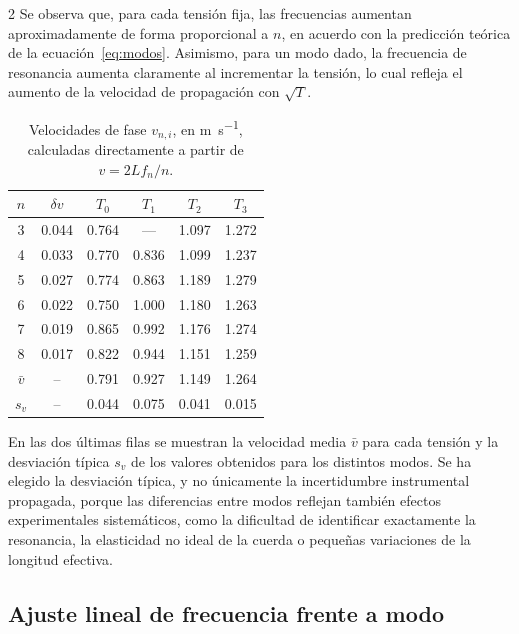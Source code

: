 \documentclass[12pt,a4paper]{article}
\begin{document}
\begin{multicols}{2}
Se observa que, para cada tensión fija, las frecuencias aumentan aproximadamente de forma proporcional a $n$, en acuerdo con la predicción teórica de la ecuación~\eqref{eq:modos}. Asimismo, para un modo dado, la frecuencia de resonancia aumenta claramente al incrementar la tensión, lo cual refleja el aumento de la velocidad de propagación con $\sqrt{T}$.

\begin{table}[H]
  \centering
  \caption{Velocidades de fase $v_{n,i}$, en \si{\metre\per\second}, calculadas directamente a partir de $v = 2Lf_n/n$.}
  \label{tab:velocidades}
  \vspace{0.2cm}
  \small
  \setlength{\tabcolsep}{2.5pt}
  \begin{tabular}{cccccc}
    \toprule
    $n$ & $\delta v$ & $T_0$ & $T_1$ & $T_2$ & $T_3$ \\
    \midrule
    3 & \num{0.044} & \num{0.764} & ---         & \num{1.097} & \num{1.272} \\
    4 & \num{0.033} & \num{0.770} & \num{0.836} & \num{1.099} & \num{1.237} \\
    5 & \num{0.027} & \num{0.774} & \num{0.863} & \num{1.189} & \num{1.279} \\
    6 & \num{0.022} & \num{0.750} & \num{1.000} & \num{1.180} & \num{1.263} \\
    7 & \num{0.019} & \num{0.865} & \num{0.992} & \num{1.176} & \num{1.274} \\
    8 & \num{0.017} & \num{0.822} & \num{0.944} & \num{1.151} & \num{1.259} \\
    \midrule
    $\bar{v}$ & -- & \num{0.791} & \num{0.927} & \num{1.149} & \num{1.264} \\
    $s_v$     & -- & \num{0.044} & \num{0.075} & \num{0.041} & \num{0.015} \\
    \bottomrule
  \end{tabular}
\end{table}

En las dos últimas filas se muestran la velocidad media $\bar{v}$ para cada tensión y la desviación típica $s_v$ de los valores obtenidos para los distintos modos. Se ha elegido la desviación típica, y no únicamente la incertidumbre instrumental propagada, porque las diferencias entre modos reflejan también efectos experimentales sistemáticos, como la dificultad de identificar exactamente la resonancia, la elasticidad no ideal de la cuerda o pequeñas variaciones de la longitud efectiva.

\subsection{Ajuste lineal de frecuencia frente a modo}


\end{multicols}
\end{document}
